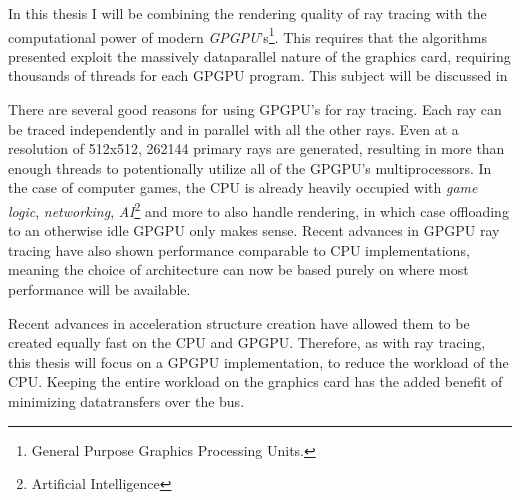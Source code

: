 
In this thesis I will be combining the rendering quality of ray
tracing with the computational power of modern
\textit{GPGPU}'s\footnote{General Purpose Graphics Processing
  Units.}. This requires that the algorithms presented exploit the
massively dataparallel nature of the graphics card, requiring
thousands of threads for each GPGPU program. This subject will be
discussed in 

There are several good reasons for using GPGPU's for ray tracing. Each
ray can be traced independently and in parallel with all the other
rays. Even at a resolution of 512x512, 262144 primary rays are
generated, resulting in more than enough threads to potentionally
utilize all of the GPGPU's multiprocessors. In the case of computer
games, the CPU is already heavily occupied with \textit{game logic},
\textit{networking}, \textit{AI}\footnote{Artificial Intelligence} and
more to also handle rendering, in which case offloading to an
otherwise idle GPGPU only makes sense. Recent advances in GPGPU ray
tracing have also shown performance comparable to CPU
implementations, meaning
the choice of architecture can now be based purely on where most
performance will be available.

Recent advances in acceleration structure creation have allowed them
to be created equally fast on the CPU and
GPGPU. Therefore, as with ray tracing, this thesis
will focus on a GPGPU implementation, to reduce the workload of the
CPU. Keeping the entire workload on the graphics card has the added
benefit of minimizing datatransfers over the bus.




